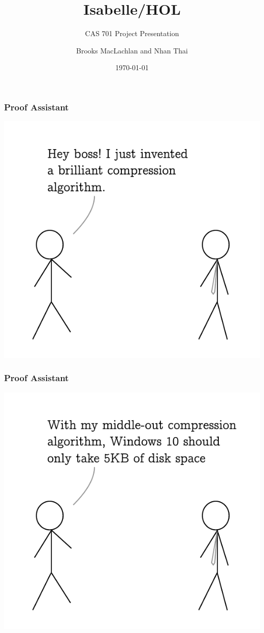 \documentclass{beamer}
\title{Isabelle/HOL}
\subtitle{CAS 701 Project Presentation}
\author{Brooks MacLachlan and Nhan Thai}
\date{\today}
\begin{document}
  \frame{\titlepage}

  \begin{frame}
    \frametitle{Proof Assistant}
    \centering
    \includegraphics[scale=0.8]{images/1.pdf}
  \end{frame}
  \begin{frame}
    \frametitle{Proof Assistant}
    \centering
    \includegraphics[scale=0.8]{images/2.pdf}
  \end{frame}
\end{document}
